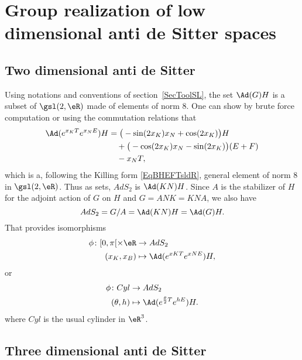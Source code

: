 \section[Low dimensional anti de Sitter spaces]{Group realization of low dimensional anti de Sitter spaces}

\subsection{Two dimensional anti de Sitter}		\label{SubsecTwoDimAdSAdGH}

Using notations and conventions of section~\ref{SecToolSL}, the set $\Ad(G)H$ is a subset of $\gsl(2,\eR)$ made of elements of norm $8$. One can show by brute force computation or using the commutation relations that
\[
\begin{split}
 \Ad( e^{x_KT} e^{x_NE})H&=\big( -\sin(2x_K)x_N+\cos(2x_K) \big)H\\
			&\quad+\big( -\cos(2x_K)x_N-\sin(2x_K) \big)(E+F)\\
			&\quad-x_NT,
\end{split}
\]
which is a, following the Killing form \eqref{EqBHEFTsldR},  general element of norm $8$ in $\gsl(2,\eR)$. Thus as sets, $AdS_2$ is $\Ad(KN)H$.  Since $A$ is the stabilizer of $H$ for the adjoint action of $G$ on $H$ and $G=ANK=KNA$, we also have
\[
  AdS_2=G/A=\Ad(KN)H=\Ad(G)H.
\]
That provides isomorphisms
\begin{equation}
\begin{aligned}
 \phi\colon [0,\pi[\times\eR&\to AdS_2 \\
(x_K,x_B)&\mapsto \Ad( e^{xK T} e^{xNE})H,
\end{aligned}
 \end{equation}
or
\begin{equation}	 \label{EqCylAdSDeux}
\begin{aligned}
 \phi\colon Cyl&\to AdS_2 \\
(\theta,h)&\mapsto \Ad( e^{\frac{ \theta }{ 2 }T} e^{hE})H.
\end{aligned}
\end{equation}
where $Cyl$ is the usual cylinder in $\eR^3$.

\subsection{Three dimensional anti de Sitter}		\label{SubsecGpAdsDeux}

